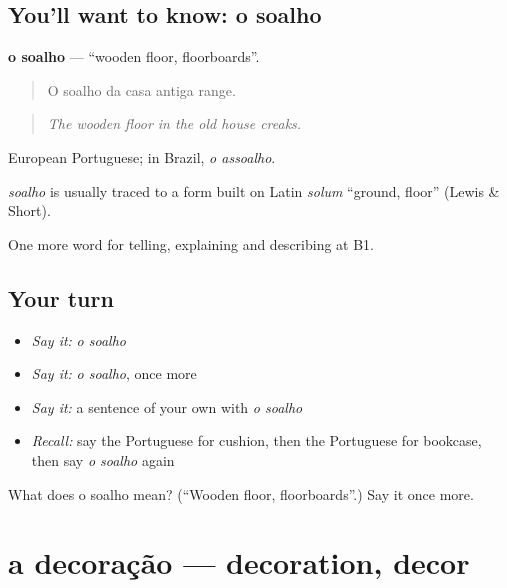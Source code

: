 \subsection*{You'll want to know: o soalho}
\textbf{o soalho} — \textquotedblleft{}wooden floor, floorboards\textquotedblright{}.

\begin{quote}
O soalho da casa antiga range.
\end{quote}

\begin{quote}
\emph{The wooden floor in the old house creaks.}
\end{quote}

European Portuguese; in Brazil, \emph{o assoalho}.

\begin{cousinweb}
\emph{soalho} is usually traced to a form built on Latin \emph{solum} \textquotedblleft{}ground, floor\textquotedblright{} (Lewis \& Short).
\end{cousinweb}

\begin{grammarlens}[title={What you've built}]
One more word for telling, explaining and describing at B1.
\end{grammarlens}

\subsection*{Your turn}
\begin{itemize}
\raggedright
  \item \emph{Say it:} \emph{o soalho}
  \item \emph{Say it:} \emph{o soalho}, once more
  \item \emph{Say it:} a sentence of your own with \emph{o soalho}
  \item \emph{Recall:} say the Portuguese for cushion, then the Portuguese for bookcase, then say \emph{o soalho} again
\end{itemize}

\begin{tcolorbox}[breakable,colback=teal!4,colframe=teal!35!black,title={Before you move on}]
What does o soalho mean? (\textquotedblleft{}Wooden floor, floorboards\textquotedblright{}.) Say it once more.
\end{tcolorbox}
\section[a decoração]{a decoração — decoration, decor}

